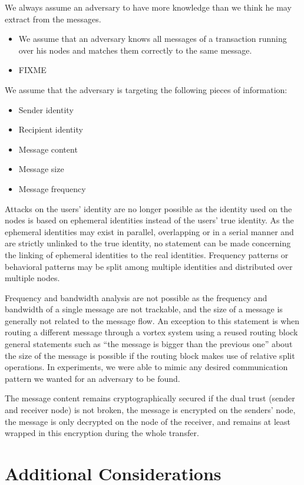 We always assume an adversary to have more knowledge than we think he may extract from the messages.
\begin{itemize}
	\item We assume that an adversary knows all messages of a transaction running over his nodes and matches them correctly to the same message.
	\item FIXME
\end{itemize}

We assume that the adversary is targeting the following pieces of information:
\begin{itemize}
	\item Sender identity
	\item Recipient identity
	\item Message content
	\item Message size
	\item Message frequency
\end{itemize}

Attacks on the users' identity are no longer possible as the identity used on the nodes is based on ephemeral identities instead of the users' true identity. As the ephemeral identities may exist in parallel, overlapping or in a serial manner and are strictly unlinked to the true identity, no statement can be made concerning the linking of ephemeral identities to the real identities. Frequency patterns or behavioral patterns may be split among multiple identities and distributed over multiple nodes. 

Frequency and bandwidth analysis are not possible as the frequency and bandwidth of a single message are not trackable, and the size of a message is generally not related to the message flow. An exception to this statement is when routing a different message through a vortex system using a reused routing block general statements such as ``the message is bigger than the previous one'' about the size of the message is possible if the routing block makes use of relative split operations. In experiments, we were able to mimic any desired communication pattern we wanted for an adversary to be found.

The message content remains cryptographically secured if the dual trust (sender and receiver node) is not broken, the message is encrypted on the senders' node, the message is only decrypted on the node of the receiver, and remains at least wrapped in this encryption during the whole transfer. 

\section{Additional Considerations}

